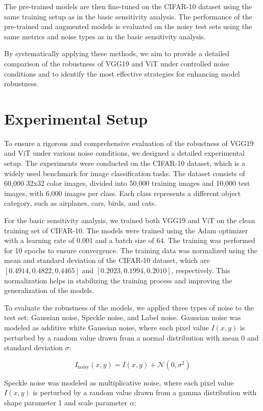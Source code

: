 \documentclass{article}
\begin{document}
The pre-trained models are then fine-tuned on the CIFAR-10 dataset using the same training setup as in the basic sensitivity analysis. The performance of the pre-trained and augmented models is evaluated on the noisy test sets using the same metrics and noise types as in the basic sensitivity analysis.

By systematically applying these methods, we aim to provide a detailed comparison of the robustness of VGG19 and ViT under controlled noise conditions and to identify the most effective strategies for enhancing model robustness.

\section{Experimental Setup}
To ensure a rigorous and comprehensive evaluation of the robustness of VGG19 and ViT under various noise conditions, we designed a detailed experimental setup. The experiments were conducted on the CIFAR-10 dataset, which is a widely used benchmark for image classification tasks. The dataset consists of 60,000 32x32 color images, divided into 50,000 training images and 10,000 test images, with 6,000 images per class. Each class represents a different object category, such as airplanes, cars, birds, and cats.

For the basic sensitivity analysis, we trained both VGG19 and ViT on the clean training set of CIFAR-10. The models were trained using the Adam optimizer with a learning rate of 0.001 and a batch size of 64. The training was performed for 10 epochs to ensure convergence. The training data was normalized using the mean and standard deviation of the CIFAR-10 dataset, which are \([0.4914, 0.4822, 0.4465]\) and \([0.2023, 0.1994, 0.2010]\), respectively. This normalization helps in stabilizing the training process and improving the generalization of the models.

To evaluate the robustness of the models, we applied three types of noise to the test set: Gaussian noise, Speckle noise, and Label noise. Gaussian noise was modeled as additive white Gaussian noise, where each pixel value \( I(x, y) \) is perturbed by a random value drawn from a normal distribution with mean 0 and standard deviation \(\sigma\):

\[
I_{\text{noisy}}(x, y) = I(x, y) + \mathcal{N}(0, \sigma^2)
\]

Speckle noise was modeled as multiplicative noise, where each pixel value \( I(x, y) \) is perturbed by a random value drawn from a gamma distribution with shape parameter 1 and scale parameter \(\alpha\):
\end{document}
